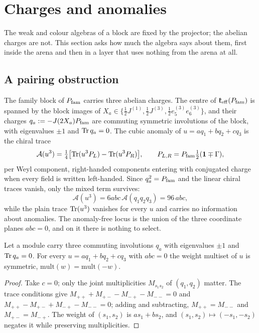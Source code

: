 \section{Charges and anomalies}
\label{sec:charges}

The weak and colour algebras of a block are fixed by the projector; the abelian charges are not. This section asks how much the
algebra says about them, first inside the arena and then in a layer that uses nothing from the arena at all.

\subsection{A pairing obstruction}
\label{sec:pairing}

The family block of $P_{\rm fam}$ carries three abelian charges. The centre of $\mathfrak k_{\rm eff}(P_{\rm fam})$ is spanned by the block images of
$X_a\in\{\tfrac12J^{(1)},\tfrac12J^{(3)},\tfrac12e^{(3)}_5e^{(3)}_6\}$, and their charges $q_a:=-J(2X_a)P_{\rm fam}$ are commuting symmetric
involutions of the block, with eigenvalues $\pm1$ and $\operatorname{Tr} q_a=0$. The cubic anomaly of $u=aq_1+bq_2+cq_3$ is the chiral trace
\[
\mathcal A(u^3)=\tfrac14\bigl[\operatorname{Tr}(u^3P_L)-\operatorname{Tr}(u^3P_R)\bigr],\qquad P_{L,R}=P_{\rm fam}\tfrac12(\mathbf 1\mp\Gamma),
\]
per Weyl component, right-handed components entering with conjugated charge when every field is written left-handed. Since
$q_a^2=P_{\rm fam}$ and the linear chiral traces vanish, only the mixed term survives:
\[
\mathcal A(u^3)=6abc\,\mathcal A(q_1q_2q_3)=96\,abc ,
\]
while the plain trace $\operatorname{Tr}(u^3)$ vanishes for every $u$ and carries no information about anomalies. The anomaly-free locus is the union
of the three coordinate planes $abc=0$, and on it there is nothing to select.

\begin{theorem}
\label{thm:pairing}
Let a module carry three commuting involutions $q_a$ with eigenvalues $\pm1$ and $\operatorname{Tr} q_a=0$. For every $u=aq_1+bq_2+cq_3$ with
$abc=0$ the weight multiset of $u$ is symmetric, $\mathrm{mult}(w)=\mathrm{mult}(-w)$.
\end{theorem}

\begin{proof}
Take $c=0$; only the joint multiplicities $M_{s_1s_2}$ of $(q_1,q_2)$ matter. The trace conditions give
$M_{++}+M_{+-}-M_{-+}-M_{--}=0$ and $M_{++}-M_{+-}+M_{-+}-M_{--}=0$; adding and subtracting, $M_{++}=M_{--}$ and $M_{+-}=M_{-+}$. The
weight of $(s_1,s_2)$ is $as_1+bs_2$, and $(s_1,s_2)\mapsto(-s_1,-s_2)$ negates it while preserving multiplicities.
\end{proof}

